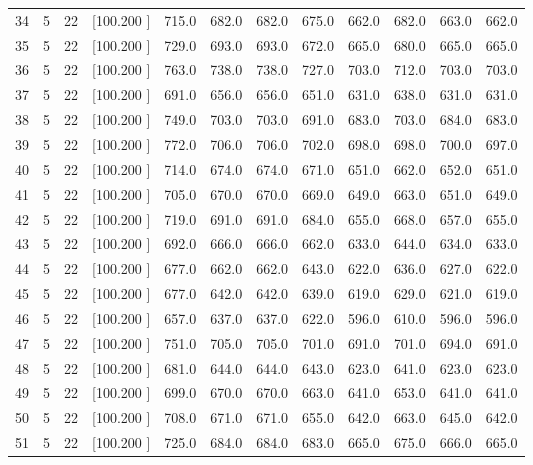 \documentclass[12pt,a4paper]{article}
\begin{document}
\begin{center}
{\begin{tabular}{r r r r r r r r r r r r}
  34&  5& 22&[100.200   ]&   715.0&   682.0&   682.0&   675.0&   662.0&   682.0&   663.0&   662.0\\[-0.02in]
  35&  5& 22&[100.200   ]&   729.0&   693.0&   693.0&   672.0&   665.0&   680.0&   665.0&   665.0\\[-0.02in]
  36&  5& 22&[100.200   ]&   763.0&   738.0&   738.0&   727.0&   703.0&   712.0&   703.0&   703.0\\[-0.02in]
  37&  5& 22&[100.200   ]&   691.0&   656.0&   656.0&   651.0&   631.0&   638.0&   631.0&   631.0\\[-0.02in]
  38&  5& 22&[100.200   ]&   749.0&   703.0&   703.0&   691.0&   683.0&   703.0&   684.0&   683.0\\[-0.02in]
  39&  5& 22&[100.200   ]&   772.0&   706.0&   706.0&   702.0&   698.0&   698.0&   700.0&   697.0\\[-0.02in]
  40&  5& 22&[100.200   ]&   714.0&   674.0&   674.0&   671.0&   651.0&   662.0&   652.0&   651.0\\[-0.02in]
  41&  5& 22&[100.200   ]&   705.0&   670.0&   670.0&   669.0&   649.0&   663.0&   651.0&   649.0\\[-0.02in]
  42&  5& 22&[100.200   ]&   719.0&   691.0&   691.0&   684.0&   655.0&   668.0&   657.0&   655.0\\[-0.02in]
  43&  5& 22&[100.200   ]&   692.0&   666.0&   666.0&   662.0&   633.0&   644.0&   634.0&   633.0\\[-0.02in]
  44&  5& 22&[100.200   ]&   677.0&   662.0&   662.0&   643.0&   622.0&   636.0&   627.0&   622.0\\[-0.02in]
  45&  5& 22&[100.200   ]&   677.0&   642.0&   642.0&   639.0&   619.0&   629.0&   621.0&   619.0\\[-0.02in]
  46&  5& 22&[100.200   ]&   657.0&   637.0&   637.0&   622.0&   596.0&   610.0&   596.0&   596.0\\[-0.02in]
  47&  5& 22&[100.200   ]&   751.0&   705.0&   705.0&   701.0&   691.0&   701.0&   694.0&   691.0\\[-0.02in]
  48&  5& 22&[100.200   ]&   681.0&   644.0&   644.0&   643.0&   623.0&   641.0&   623.0&   623.0\\[-0.02in]
  49&  5& 22&[100.200   ]&   699.0&   670.0&   670.0&   663.0&   641.0&   653.0&   641.0&   641.0\\[-0.02in]
  50&  5& 22&[100.200   ]&   708.0&   671.0&   671.0&   655.0&   642.0&   663.0&   645.0&   642.0\\[-0.02in]
  51&  5& 22&[100.200   ]&   725.0&   684.0&   684.0&   683.0&   665.0&   675.0&   666.0&   665.0\\[-0.02in]

\end{tabular}}
\end{center}
\end{document}

